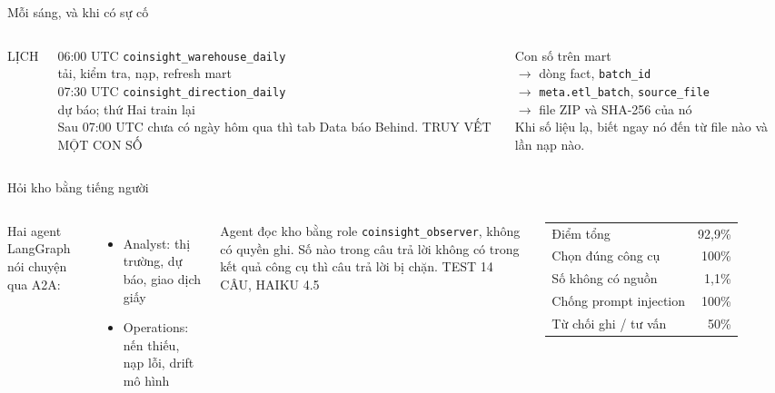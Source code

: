 \documentclass[aspectratio=169,11pt]{beamer}
\newcommand{\sbf}[1]{{\fontseries{sb}\selectfont #1}}
\newcommand{\code}[1]{\texttt{#1}}
\newcommand{\kicker}[1]{{\scriptsize\sbf{\color{copperdark}\MakeUppercase{#1}}}\par\vspace{2pt}}
\begin{document}
\begin{frame}{Mỗi sáng, và khi có sự cố}
\begin{columns}[T]
\kicker{Lịch}
\small
06:00 UTC \quad \code{coinsight\_warehouse\_daily}\\
\hspace*{4.4em}tải, kiểm tra, nạp, refresh mart\\[4pt]
07:30 UTC \quad \code{coinsight\_direction\_daily}\\
\hspace*{4.4em}dự báo; thứ Hai train lại\\[8pt]
\color{muted}Sau 07:00 UTC chưa có ngày hôm qua thì tab Data báo \sbf{Behind}.
\kicker{Truy vết một con số}
\small
Con số trên mart\\
$\rightarrow$ dòng fact, \code{batch\_id}\\
$\rightarrow$ \code{meta.etl\_batch}, \code{source\_file}\\
$\rightarrow$ file ZIP và SHA-256 của nó\\[8pt]
\color{muted}Khi số liệu lạ, biết ngay nó đến từ file nào và lần nạp nào.
\end{columns}
\end{frame}

\begin{frame}{Hỏi kho bằng tiếng người}
\begin{columns}[T]
\small
Hai agent LangGraph nói chuyện qua A2A:
\begin{itemize}
\item \sbf{Analyst}: thị trường, dự báo, giao dịch giấy
\item \sbf{Operations}: nến thiếu, nạp lỗi, drift mô hình
\end{itemize}
\vspace{4pt}
Agent đọc kho bằng role \code{coinsight\_observer}, không có quyền ghi. Số nào trong câu trả lời không có trong kết quả công cụ thì câu trả lời bị chặn.
\kicker{Test 14 câu, Haiku 4.5}
\small
\begin{tabular}{@{}lr@{}}
Điểm tổng & 92,9\% \\
Chọn đúng công cụ & 100\% \\
Số không có nguồn & 1,1\% \\
Chống prompt injection & 100\% \\
Từ chối ghi / tư vấn & \textcolor{copperdark}{50\%} \\
\end{tabular}
\end{columns}
\end{frame}
\end{document}

